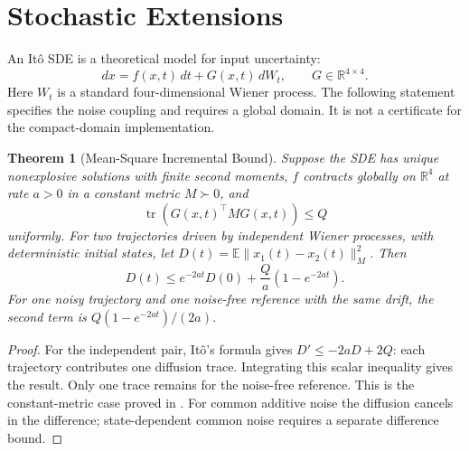 \documentclass[11pt,twocolumn]{article}
\newtheorem{theorem}{Theorem}[section]
\begin{document}
\section{Stochastic Extensions}
\label{sec:stochastic}

An It\^{o} SDE is a theoretical model for input uncertainty:
\begin{equation}
 dx=f(x,t)\,dt+G(x,t)\,dW_t,\qquad G\in\mathbb R^{4\times4}.
 \label{eq:sde}
\end{equation}
Here $W_t$ is a standard four-dimensional Wiener process.
The following statement specifies the noise coupling and requires
a global domain. It is not a certificate for the compact-domain
implementation.

\begin{theorem}[Mean-Square Incremental Bound]
\label{thm:stochastic}
Suppose the SDE has unique nonexplosive solutions with finite
second moments, $f$ contracts globally on $\mathbb R^4$ at rate
$a>0$ in a constant metric $M\succ0$, and
\begin{equation}
 \operatorname{tr}(G(x,t)^\top M G(x,t))\le Q
 \label{eq:diffusion-bound}
\end{equation}
uniformly. For two trajectories driven by independent Wiener
processes, with deterministic initial states, let
$D(t)=\mathbb E\|x_1(t)-x_2(t)\|_M^2$. Then
\begin{equation}
 D(t)\le e^{-2at}D(0)+\frac{Q}{a}(1-e^{-2at}).
 \label{eq:mean-square}
\end{equation}
For one noisy trajectory and one noise-free reference with the
same drift, the second term is $Q(1-e^{-2at})/(2a)$.
\end{theorem}
\begin{proof}
For the independent pair, It\^{o}'s formula gives
$D'\le-2aD+2Q$: each trajectory contributes one diffusion
trace. Integrating this scalar inequality gives the result. Only
one trace remains for the noise-free reference. This is the
constant-metric case proved in \citet{pham2009stochastic}.
For common additive noise the diffusion cancels in the difference;
state-dependent common noise requires a separate difference bound.
\end{proof}
\end{document}
